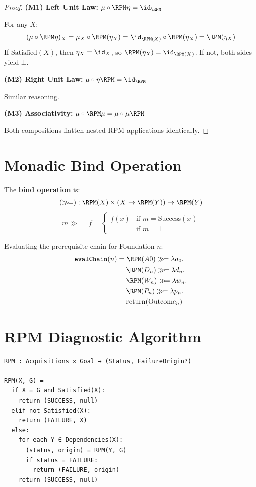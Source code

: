 \begin{proof}
\textbf{(M1) Left Unit Law:} $\mu \circ \RPM\eta = \id_\RPM$

For any $X$:
\[
(\mu \circ \RPM\eta)_X = \mu_X \circ \RPM(\eta_X) = \id_{\RPM(X)} \circ \RPM(\eta_X) = \RPM(\eta_X)
\]
If $\mathrm{Satisfied}(X)$, then $\eta_X = \id_X$, so $\RPM(\eta_X) = \id_{\RPM(X)}$.
If not, both sides yield $\bot$.

\textbf{(M2) Right Unit Law:} $\mu \circ \eta\RPM = \id_\RPM$

Similar reasoning.

\textbf{(M3) Associativity:} $\mu \circ \RPM\mu = \mu \circ \mu\RPM$

Both compositions flatten nested RPM applications identically.
\end{proof}

\section{Monadic Bind Operation}

\begin{definition}
\label{def:kleisli-bind}
The \textbf{bind operation} is:
\[
(\gg\!=) : \RPM(X) \times (X \to \RPM(Y)) \to \RPM(Y)
\]
\[
m \gg\!= f = \begin{cases}
f(x) & \text{if } m = \mathrm{Success}(x) \\
\bot & \text{if } m = \bot
\end{cases}
\]
\end{definition}

\begin{example}
\label{ex:chain-eval}
Evaluating the prerequisite chain for Foundation $n$:
\begin{align}
\texttt{evalChain}(n) &= \RPM(A0) \gg\!= \lambda a_0. \\
&\quad\; \RPM(D_n) \gg\!= \lambda d_n. \\
&\quad\; \RPM(W_n) \gg\!= \lambda w_n. \\
&\quad\; \RPM(P_n) \gg\!= \lambda p_n. \\
&\quad\; \mathrm{return}(\mathrm{Outcome}_n)
\end{align}
\end{example}

\section{RPM Diagnostic Algorithm}

\begin{definition}
\label{def:rpm-diag}
\begin{verbatim}
RPM : Acquisitions × Goal → (Status, FailureOrigin?)

RPM(X, G) =
  if X = G and Satisfied(X):
    return (SUCCESS, null)
  elif not Satisfied(X):
    return (FAILURE, X)
  else:
    for each Y ∈ Dependencies(X):
      (status, origin) = RPM(Y, G)
      if status = FAILURE:
        return (FAILURE, origin)
    return (SUCCESS, null)
\end{verbatim}
\end{definition}

